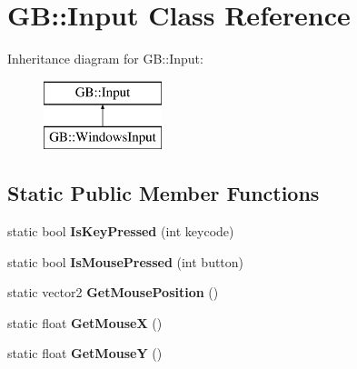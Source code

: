 \hypertarget{class_g_b_1_1_input}{}\section{GB\+::Input Class Reference}
\label{class_g_b_1_1_input}
Inheritance diagram for GB\+::Input\+:\begin{figure}[H]
\begin{center}
\leavevmode
\includegraphics[height=2.000000cm]{class_g_b_1_1_input}
\end{center}
\end{figure}
\subsection*{Static Public Member Functions}
\begin{DoxyCompactItemize}
\item 
\mbox{\label{class_g_b_1_1_input_a79608237d8107643d8559b3b0de9ec04}} 
static bool {\bfseries Is\+Key\+Pressed} (int keycode)
\item 
\mbox{\label{class_g_b_1_1_input_aa3eed149a0a0d176dccf61ea4f39425e}} 
static bool {\bfseries Is\+Mouse\+Pressed} (int button)
\item 
\mbox{\label{class_g_b_1_1_input_a0fb8798e613d24c2244d469f7afb3c03}} 
static vector2 {\bfseries Get\+Mouse\+Position} ()
\item 
\mbox{\label{class_g_b_1_1_input_a361a12abe24440bc7ba41293d7a5069a}} 
static float {\bfseries Get\+MouseX} ()
\item 
\mbox{\label{class_g_b_1_1_input_a98ad78bf69c752ef113126d8e73ca65d}} 
static float {\bfseries Get\+MouseY} ()
\end{DoxyCompactItemize}
